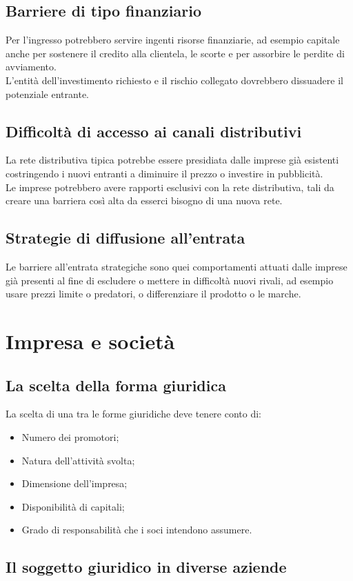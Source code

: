 \documentclass{report}
\begin{document}
	\section{Barriere di tipo finanziario}
	Per l'ingresso potrebbero servire ingenti risorse finanziarie, ad esempio capitale anche per sostenere il credito alla clientela, le scorte e per assorbire le perdite di avviamento. \medskip \\L'entità dell'investimento richiesto e il rischio collegato dovrebbero dissuadere il potenziale entrante.
	\section{Difficoltà di accesso ai canali distributivi}
	La rete distributiva tipica potrebbe essere presidiata dalle imprese già esistenti costringendo i nuovi entranti a diminuire il prezzo o investire in pubblicità.\medskip \\Le imprese potrebbero avere rapporti esclusivi con la rete distributiva, tali da creare una barriera così alta da esserci bisogno di una nuova rete.
	\section{Strategie di diffusione all'entrata}
	Le barriere all'entrata strategiche sono quei comportamenti attuati dalle imprese già presenti al fine di escludere o mettere in difficoltà nuovi rivali, ad esempio usare prezzi limite o predatori, o differenziare il prodotto o le marche.
	
	\chapter{Impresa e società}
	\section{La scelta della forma giuridica}
	La scelta di una tra le forme giuridiche deve tenere conto di:
	\begin{itemize}
		\item Numero dei promotori;
		\item Natura dell'attività svolta;
		\item Dimensione dell'impresa;
		\item Disponibilità di capitali;
		\item Grado di responsabilità che i soci intendono assumere.
	\end{itemize}
	\section{Il soggetto giuridico in diverse aziende}
\end{document}
